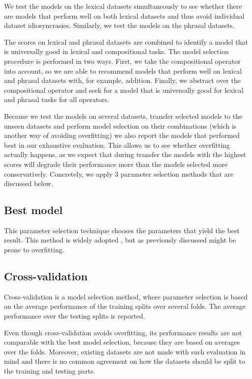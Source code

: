 We test the models on the lexical datasets simultaneously to see whether there are models that perform well on both lexical datasets and thus avoid individual dataset idiosyncrasies. Similarly, we test the models on the phrasal datasets.

The scores on lexical and phrasal datasets are combined
to identify a model that is universally good in lexical and compositional tasks. The model selection procedure is performed in two ways. First, we take the compositional operator into account, so we are able to recommend models that perform well on lexical and phrasal datasets with, for example, addition. Finally, we abstract over the compositional operator and seek for a model that is universally good for lexical and phrasal tasks for all operators.

Because we test the models on several datasets, transfer selected models to the unseen datasets and perform model selection on their combinations (which is another way of avoiding overfitting) we also report the models that performed best in our exhaustive evaluation. This allows us to see whether overfitting actually happens, as we expect that during transfer the models with the highest scores will degrade their performance more than the models selected more conservatively. Concretely, we apply 3 parameter selection methods that are discussed below.

\subsection{Best model}

This parameter selection technique chooses the parameters that yield the best result. This method is widely adopted \cite{mitchell-lapata:2008:ACLMain,Grefenstette:2011:ESC:2145432.2145580,milajevs-purver:2014:CVSC,milajevs-EtAl:2014:EMNLP2014}, but as previously discussed might be prone to overfitting.

\subsection{Cross-validation}

Cross-validation is a model selection method, where parameter selection is based on the average performance of the training splits over several folds. The average performance over the testing splits is reported.

Even though cross-validation avoids overfitting, its performance results are not comparable with the best model selection, because they are based on averages over the folds. Moreover, existing datasets are not made with such evaluation in mind \cite{W16-2506} and there is no common agreement on how the datasets should be split to the training and testing parts.

